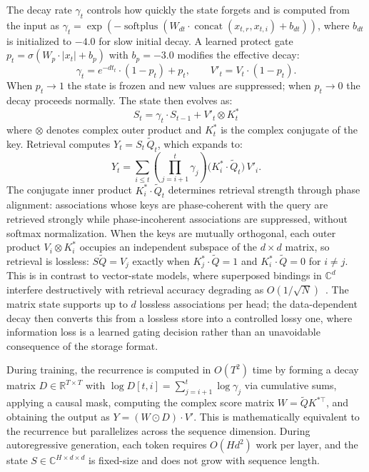 \documentclass[aps,prl,twocolumn,superscriptaddress,amsmath,amssymb]{revtex4-2}
\newcommand{\Complex}{\mathbb{C}}
\newcommand{\concat}{\operatorname{concat}}
\begin{document}
The decay rate $\gamma_t$ controls how quickly the state forgets and is computed from the input as $\gamma_t = \exp(-\operatorname{softplus}(W_{dt} \cdot \concat(x_{t,r}, x_{t,i}) + b_{dt}))$, where $b_{dt}$ is initialized to $-4.0$ for slow initial decay. A learned protect gate $p_t = \sigma(W_p \cdot |x_t| + b_p)$ with $b_p = -3.0$ modifies the effective decay:
\begin{equation}
  \gamma_t = e^{-dt_t} \cdot (1 - p_t) + p_t, \qquad V'_t = V_t \cdot (1 - p_t) .
\end{equation}
When $p_t \to 1$ the state is frozen and new values are suppressed; when $p_t \to 0$ the decay proceeds normally. The state then evolves as:
\begin{equation}
  S_t = \gamma_t \cdot S_{t-1} + V'_t \otimes K_t^*
\end{equation}
where $\otimes$ denotes complex outer product and $K_t^*$ is the complex conjugate of the key. Retrieval computes $Y_t = S_t \, \tilde{Q}_t$, which expands to:
\begin{equation}
  Y_t = \sum_{i \leq t} \left(\prod_{j=i+1}^{t} \gamma_j\right) \bigl(K_i^* \cdot \tilde{Q}_t\bigr) \, V'_i .
\label{eq:pam-expand}
\end{equation}
The conjugate inner product $K_i^* \cdot \tilde{Q}_t$ determines retrieval strength through phase alignment: associations whose keys are phase-coherent with the query are retrieved strongly while phase-incoherent associations are suppressed, without softmax normalization. When the keys are mutually orthogonal, each outer product $V_i \otimes K_i^*$ occupies an independent subspace of the $d \times d$ matrix, so retrieval is lossless: $S \tilde{Q} = V_j$ exactly when $K_j^* \cdot \tilde{Q} = 1$ and $K_i^* \cdot \tilde{Q} = 0$ for $i \neq j$. This is in contrast to vector-state models, where superposed bindings in $\Complex^d$ interfere destructively with retrieval accuracy degrading as $O(1/\sqrt{N})$~\cite{plate1995holographic}. The matrix state supports up to $d$ lossless associations per head; the data-dependent decay then converts this from a lossless store into a controlled lossy one, where information loss is a learned gating decision rather than an unavoidable consequence of the storage format.

During training, the recurrence is computed in $O(T^2)$ time by forming a decay matrix $D \in \mathbb{R}^{T \times T}$ with $\log D[t,i] = \sum_{j=i+1}^{t} \log \gamma_j$ via cumulative sums, applying a causal mask, computing the complex score matrix $W = \tilde{Q} K^{*\top}$, and obtaining the output as $Y = (W \odot D) \cdot V'$. This is mathematically equivalent to the recurrence but parallelizes across the sequence dimension. During autoregressive generation, each token requires $O(Hd^2)$ work per layer, and the state $S \in \Complex^{H \times d \times d}$ is fixed-size and does not grow with sequence length.
\end{document}
